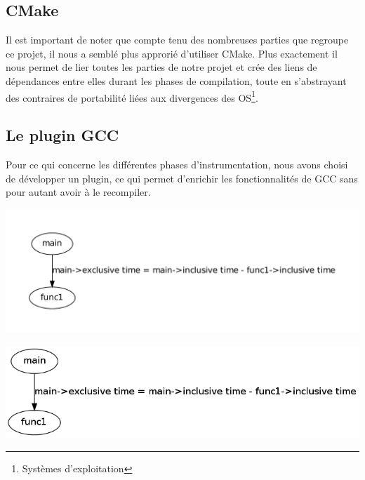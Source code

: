 
\subsection{CMake}

Il est important de noter que compte tenu des nombreuses parties que regroupe ce projet, il nous a semblé plus approrié d'utiliser CMake. Plus exactement il nous permet de lier toutes les parties de notre projet et crée des liens de dépendances entre elles durant les phases de compilation, toute en s'abstrayant des contraires de portabilité liées aux divergences des OS\footnote{Systèmes d'exploitation}.

\subsection{Le plugin GCC}

Pour ce qui concerne les différentes phases d'instrumentation, nous avons choisi de développer un plugin, ce qui permet d'enrichir les fonctionnalités de GCC sans pour autant avoir à le recompiler.

\begin{center}
  \includegraphics[scale=0.50]{images/tree2.pdf}
\end{center}

\begin{center}
  \includegraphics[scale=0.50]{images/tree.png}
\end{center}
